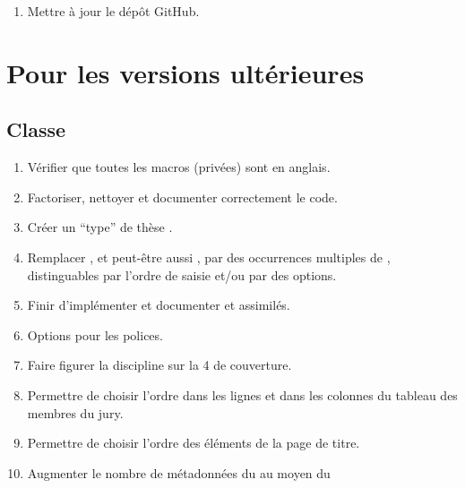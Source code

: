\begin{enumerate}
\item Mettre à jour le dépôt GitHub.
\end{enumerate}

\section{Pour les versions ultérieures}
\label{sec:pour-les-versions}

\subsection{Classe}
\label{sec:classe-ult}

\begin{enumerate}
\item Vérifier que toutes les macros (privées) sont en anglais.
\item Factoriser, nettoyer et documenter correctement le code.
\item Créer un \enquote{type} de thèse .
\item Remplacer , et peut-être aussi , par des
  occurrences multiples de , distinguables par l'ordre de saisie
  et/ou par des  options.
\item Finir d'implémenter et documenter  et
  assimilés.
\item Options pour les polices.
\item Faire figurer la discipline sur la 4\ieme{} de couverture.
\item Permettre de choisir l'ordre dans les lignes et dans les colonnes du
  tableau des membres du jury.
\item Permettre de choisir l'ordre des éléments de la page de titre.
\item Augmenter le nombre de métadonnées du  au moyen du

\end{enumerate}

